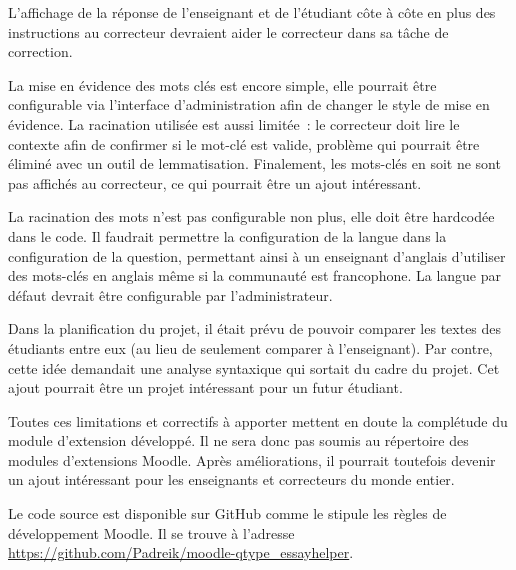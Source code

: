 \begin{conclusion}



L'affichage de la réponse de l'enseignant et de l'étudiant côte à côte en plus des instructions au correcteur devraient aider le correcteur dans sa tâche de correction.

La mise en évidence des mots clés est encore simple, elle pourrait être configurable via l'interface d'administration afin de changer le style de mise en évidence.
La racination utilisée est aussi limitée~: le correcteur doit lire le contexte afin de confirmer si le mot-clé est valide, problème qui pourrait être éliminé avec un outil de lemmatisation.
Finalement, les mots-clés en soit ne sont pas affichés au correcteur, ce qui pourrait être un ajout intéressant.

La racination des mots n'est pas configurable non plus, elle doit être \og hardcodée \fg{} dans le code.
Il faudrait permettre la configuration de la langue dans la configuration de la question, permettant ainsi à un enseignant d'anglais d'utiliser des mots-clés en anglais même si la communauté est francophone.
La langue par défaut devrait être configurable par l'administrateur.

Dans la planification du projet, il était prévu de pouvoir comparer les textes des étudiants entre eux (au lieu de seulement comparer à l'enseignant).
Par contre, cette idée demandait une analyse syntaxique qui sortait du cadre du projet.
Cet ajout pourrait être un projet intéressant pour un futur étudiant.

Toutes ces limitations et correctifs à apporter mettent en doute la complétude du module d'extension développé.
Il ne sera donc pas soumis au répertoire des modules d'extensions Moodle.
Après améliorations, il pourrait toutefois devenir un ajout intéressant pour les enseignants et correcteurs du monde entier.

Le code source est disponible sur GitHub comme le stipule les règles de développement Moodle.
Il se trouve à l'adresse \url{https://github.com/Padreik/moodle-qtype_essayhelper}.

\end{conclusion}

